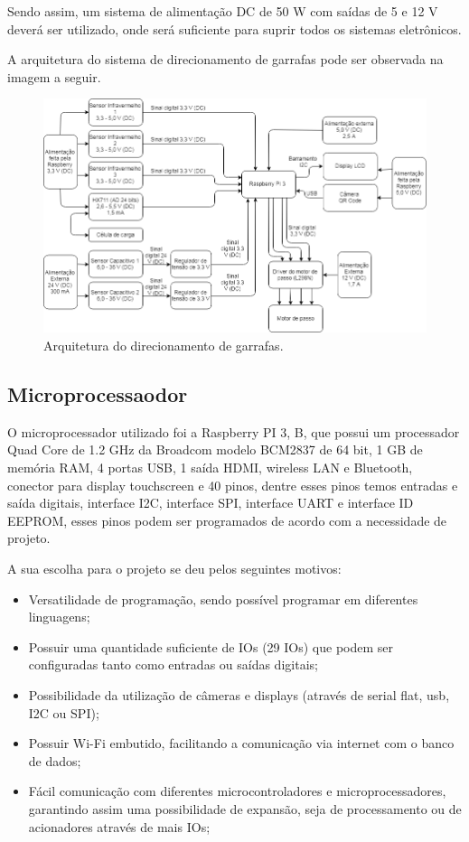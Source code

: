 Sendo assim, um sistema de alimentação DC de 50 W com saídas de 5 e 12 V deverá ser utilizado, onde será suficiente para suprir todos os sistemas eletrônicos.

A arquitetura do sistema de direcionamento de garrafas pode ser observada na imagem a seguir.

\begin{figure}[!ht]
	\centering
		\includegraphics[scale=0.5]{figuras/eletronica/2-Arquitetura-do-direcionamento.png}
	\caption{Arquitetura do direcionamento de garrafas.}
\end{figure}

\subsection{Microprocessaodor}

O microprocessador utilizado foi a Raspberry PI 3, B, que possui um processador Quad Core de 1.2 GHz da Broadcom modelo BCM2837 de 64 bit, 1 GB de memória RAM, 4 portas USB, 1 saída HDMI, wireless LAN e Bluetooth, conector para display touchscreen e 40 pinos, dentre esses pinos temos entradas e saída digitais, interface I2C, interface SPI, interface UART e interface ID EEPROM, esses pinos podem ser programados de acordo com a necessidade de projeto. \cite{raspberryPi}

A sua escolha para o projeto se deu pelos seguintes motivos:

\begin{itemize}
    \item Versatilidade de programação, sendo possível programar em diferentes linguagens;
    \item Possuir uma quantidade suficiente de IOs (29 IOs) que podem ser configuradas tanto como entradas ou saídas digitais;
    \item Possibilidade da utilização de câmeras e displays (através de serial flat, usb, I2C ou SPI);
    \item Possuir Wi-Fi embutido, facilitando a comunicação via internet com o banco de dados;
    \item Fácil comunicação com diferentes microcontroladores e microprocessadores, garantindo assim uma possibilidade de  expansão, seja de processamento ou de acionadores através de mais IOs;
\end{itemize}

